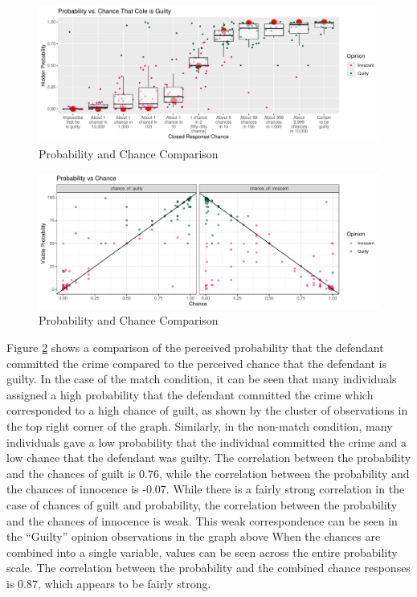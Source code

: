 \documentclass[print]{nuthesis}
\begin{document}
\begin{figure}

{\centering \includegraphics[width=\linewidth]{thesis_files/figure-latex/likeprob-1} 

}

\caption{Probability and Chance Comparison}\label{fig:likeprob}
\end{figure}

\begin{figure}

{\centering \includegraphics[width=\linewidth]{thesis_files/figure-latex/likeprobcon-1} 

}

\caption{Probability and Chance Comparison}\label{fig:likeprobcon}
\end{figure}

Figure \ref{fig:likeprobcon} shows a comparison of the perceived probability that the defendant committed the crime compared to the perceived chance that the defendant is guilty.
In the case of the match condition, it can be seen that many individuals assigned a high probability that the defendant committed the crime which corresponded to a high chance of guilt, as shown by the cluster of observations in the top right corner of the graph.
Similarly, in the non-match condition, many individuals gave a low probability that the individual committed the crime and a low chance that the defendant was guilty.
The correlation between the probability and the chances of guilt is 0.76,
while the correlation between the probability and the chances of innocence is -0.07.
While there is a fairly strong correlation in the case of chances of guilt and probability, the correlation between the probability and the chances of innocence is weak.
This weak correspondence can be seen in the ``Guilty'' opinion observations in the graph above
When the chances are combined into a single variable, values can be seen across the entire probability scale.
The correlation between the probability and the combined chance responses is 0.87, which appears to be fairly strong.
\end{document}
